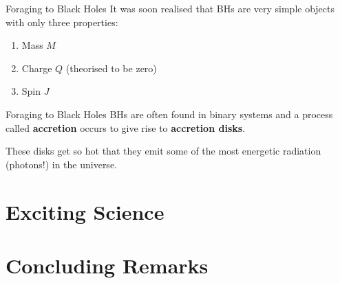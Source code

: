 \documentclass{beamer}
\begin{document}
\begin{frame}{Foraging to Black Holes}
    It was soon realised that BHs are very simple objects with only three properties:

    \vspace{0.5cm}

    \begin{enumerate}
        \item Mass $M$
        \item Charge $Q$ (theorised to be zero)
        \item Spin $J$
    \end{enumerate}
\end{frame}


\begin{frame}{Foraging to Black Holes}
    BHs are often found in binary systems and a process called \textbf{accretion} occurs to give rise to \textbf{accretion disks}.

    \vspace{0.5cm}

    These disks get so hot that they emit some of the most energetic radiation (photons!) in the universe.
\end{frame}


\section{Exciting Science}


\section{Concluding Remarks}
\end{document}

